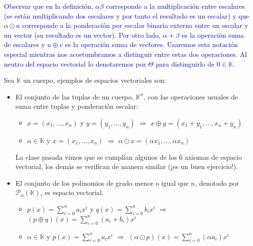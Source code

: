\documentclass[12pt]{book}
\def\K{\mathbb{K}}
\def\P{\mathcal{P}}
\begin{document}
\textcolor{blue}{Observar que en la definici\'on, $\alpha\beta$ corresponde a la multiplicaci\'on entre escalares (se est\'an multiplicando dos escalares y por tanto el resultado es un escalar) y que $\alpha \odot u$ corresponde a la ponderación por escalar binaria externa entre un escalar y un vector (su resultado es un vector).
Por otro lado, $\alpha+\beta$ es la operaci\'on suma de escalares y $u\oplus v$ es la operaci\'on suma de vectores.
Usaremos esta notación especial mientras nos acostumbramos a distinguir entre estas dos operaciones.
Al neutro del espacio vectorial lo denotaremos por $\Theta$ para distinguirlo de $0\in\K$.
}



Sea $\K$ un cuerpo, ejemplos de espacios vectoriales son:

\begin{itemize}
\item El conjunto de las tuplas de un cuerpo, $\K^n$, con las operaciones usuales de suma entre tuplas y ponderaci\'on escalar:

\begin{itemize}
\item $x=(x_1,\dots,x_n)$ y $y=(y_1,\dots,y_n)$ $\Rightarrow$ $x\oplus y=(x_1+y_1,\dots,x_n+y_n)$
\item $\alpha\in\K$ y $x=(x_1,\dots,x_n)$ $\Rightarrow$ $\alpha\odot x=(\alpha x_1,\dots,\alpha x_n)$
\end{itemize}
La clase pasada vimos que se cumplían algunos de los 6 axiomas de espacio vectorial, los demás se verifican de manera similar (¡es un buen ejercicio!).


\item El conjunto de los polinomios de grado menor o igual que $n$, denotado por $\P_n(\K)$, es espacio vectorial.

\begin{itemize}
\item $p(x)=\displaystyle\sum_{i=0}^n a_ix^i$ y $q(x)=\displaystyle\sum_{i=0}^nb_{i}x^i$ $\Rightarrow$ $(p\oplus q)(x)=\displaystyle\sum_{i=0}^n(a_{i}+b_i)x^i$
\item $\alpha\in\K$ y $p(x)=\displaystyle\sum_{i=0}^na_{i}x^i$  $\Rightarrow$ $(\alpha\odot p)(x)=\displaystyle\sum_{i=0}^n(\alpha a_{i})x^i$ 
\end{itemize}



\end{itemize}
\end{document}
